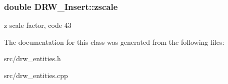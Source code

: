 \subsubsection[{zscale}]{\setlength{\rightskip}{0pt plus 5cm}double D\+R\+W\+\_\+\+Insert\+::zscale}\label{class_d_r_w___insert_a0f1cd0ef6b837894679b1135ce4bb132}
z scale factor, code 43 

The documentation for this class was generated from the following files\+:\begin{DoxyCompactItemize}
\item 
src/drw\+\_\+entities.\+h\item 
src/drw\+\_\+entities.\+cpp\end{DoxyCompactItemize}
